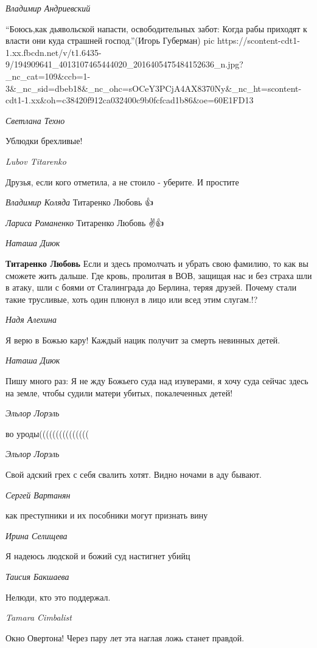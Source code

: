 \emph{Владимир Андриевский}

\enquote{Боюсь,как дьявольской напасти, освободительных забот: Когда рабы приходят к власти они куда страшней господ.}(Игорь Губерман)
\ifcmt
  pic https://scontent-cdt1-1.xx.fbcdn.net/v/t1.6435-9/194909641_4013107465444020_2016405475484152636_n.jpg?_nc_cat=109&ccb=1-3&_nc_sid=dbeb18&_nc_ohc=sOCeY3PCjA4AX8370Ny&_nc_ht=scontent-cdt1-1.xx&oh=c38420f912ca032400c9b0fcfcad1b86&oe=60E1FD13
\fi

\emph{Светлана Техно}

Ублюдки брехливые!

\emph{Lubov Titarenko}

Друзья, если кого отметила, а не стоило - уберите. И простите

\emph{Владимир Коляда}
Титаренко Любовь 👍

\emph{Лариса Романенко}
Титаренко Любовь ✌️👍💖

\emph{Наташа Диюк}

\textbf{Титаренко Любовь} Если и здесь промолчать и убрать свою фамилию, то как
вы сможете жить дальше. Где кровь, пролитая в ВОВ, защищая нас и без страха шли
в атаку, шли с боями от Сталинграда до Берлина, теряя друзей. Почему стали
такие трусливые, хоть один плюнул в лицо или всед этим слугам.!?

\emph{Надя Алехина}

Я верю в Божью кару! Каждый нацик получит за смерть невинных детей.

\emph{Наташа Диюк}

Пишу много раз: Я не жду Божьего суда над изуверами, я хочу суда сейчас здесь
на земле, чтобы судили матери убитых, покалеченных детей!

\emph{Эльлор Лорэль}

во уроды(((((((((((((((

\emph{Эльлор Лорэль}

Свой адский грех с себя свалить хотят. Видно ночами в аду бывают.

\emph{Сергей Вартанян}

как преступники и их пособники могут признать вину

\emph{Ирина Селищева}

Я надеюсь людской и божий суд настигнет убийц

\emph{Таисия Бакшаева}

Нелюди, кто это поддержал.

\emph{Tamara Cimbalist}

Окно Овертона! Через пару лет эта наглая ложь станет правдой.

